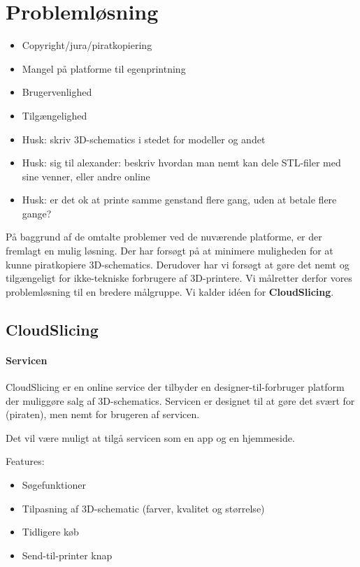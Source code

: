 \chapter{Problemløsning} %
\label{cha:probleml_sning}

\begin{itemize}
	\item Copyright/jura/piratkopiering
	\item Mangel på platforme til egenprintning
	\item Brugervenlighed
	\item Tilgængelighed
	\item Husk: skriv 3D-schematics i stedet for modeller og andet
	\item Husk: sig til alexander: beskriv hvordan man nemt kan dele STL-filer med sine venner, eller andre online
	\item Husk: er det ok at printe samme genstand flere gang, uden at betale flere gange?
\end{itemize}

På baggrund af de omtalte problemer ved de nuværende platforme, er der fremlagt en mulig løsning. Der har forsøgt på at minimere muligheden for at kunne piratkopiere 3D-schematics. Derudover har vi forsøgt at gøre det nemt og tilgængeligt for ikke-tekniske forbrugere af 3D-printere. Vi målretter derfor vores problemløsning til en bredere målgruppe. Vi kalder idéen for \textbf{CloudSlicing}. 

\section{CloudSlicing} %
\label{sec:cloudslicing}

\subsubsection{Servicen} %
\label{ssub:servicen}

CloudSlicing er en online service der tilbyder en designer-til-forbruger platform der muliggøre salg af 3D-schematics. Servicen er designet til at gøre det svært for (piraten), men nemt for brugeren af servicen.

Det vil være muligt at tilgå servicen som en app og en hjemmeside.

Features:
\begin{itemize}
	\item Søgefunktioner
	\item Tilpasning af 3D-schematic (farver, kvalitet og størrelse)
	\item Tidligere køb
	\item Send-til-printer knap
\end{itemize}

